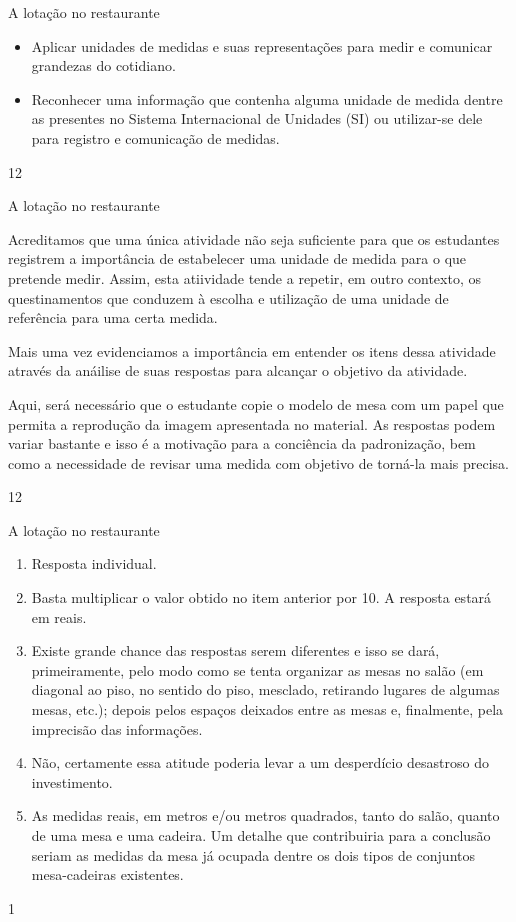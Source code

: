 \begin{objectives}{A lotação no restaurante}
{
\begin{itemize}
\item Aplicar unidades de medidas e suas representações para medir e comunicar grandezas do cotidiano.

\item Reconhecer uma informação que contenha alguma unidade de medida dentre as presentes no Sistema Internacional de Unidades (SI) ou utilizar-se dele para registro e comunicação de medidas.
\end{itemize}
}{1}{2}
\end{objectives}
\begin{sugestions}{A lotação no restaurante}
{
Acreditamos que uma única atividade não seja suficiente para que os estudantes registrem a importância de estabelecer uma unidade de medida para o que pretende medir. Assim, esta atiividade tende a repetir, em outro contexto, os questinamentos que conduzem à escolha e utilização de uma unidade de referência para uma certa medida.

Mais uma vez evidenciamos a importância em entender os itens dessa atividade através da anáilise de suas respostas para alcançar o objetivo da atividade.

Aqui, será necessário que o estudante copie o modelo de mesa com um papel que permita a reprodução da imagem apresentada no material. As respostas podem variar bastante e isso é a motivação para a conciência da padronização, bem como a necessidade de revisar uma medida com objetivo de torná-la mais precisa.
}{1}{2}
\end{sugestions}
\begin{answer}{A lotação no restaurante}
{
\begin{enumerate}
\item {} 
Resposta individual.

\item {} 
Basta multiplicar o valor obtido no item anterior por 10. A resposta estará em reais.

\item {} 
Existe grande chance das respostas serem diferentes e isso se dará, primeiramente, pelo modo como se tenta organizar as mesas no salão (em diagonal ao piso, no sentido do piso, mesclado, retirando lugares de algumas mesas, etc.); depois pelos espaços deixados entre as mesas e, finalmente, pela imprecisão das informações.

\item {} 
Não, certamente essa atitude poderia levar a um desperdício desastroso do investimento.

\item {} 
As medidas reais, em metros e/ou metros quadrados, tanto do salão, quanto de uma mesa e uma cadeira. Um detalhe que contribuiria para a conclusão seriam as medidas da mesa já ocupada dentre os dois tipos de conjuntos mesa-cadeiras existentes.

\end{enumerate}
}{1}
\end{answer}
